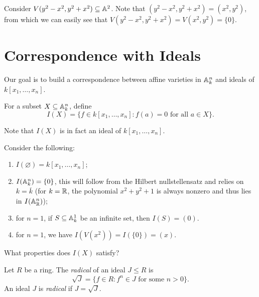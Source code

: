 \begin{example}
  Consider $V(y^2 - x^2, y^2 + x^2) \subseteq \mathbb{A}^2$.
  Note that $(y^2 - x^2, y^2 + x^2) = (x^2, y^2)$,
  from which we can easily see that
  $V(y^2 - x^2, y^2 + x^2) = V(x^2, y^2) = \{0\}$.
\end{example}

\section{Correspondence with Ideals}

\begin{remark}
  Our goal is to build a correspondence
  between affine varieties in $\mathbb{A}^n_k$
  and ideals of $k[x_1, \dots, x_n]$.
\end{remark}

\begin{definition}
  For a subset $X \subseteq \mathbb{A}^n_k$,
  define
  \[
    I(X) = \{f \in k[x_1, \dots, x_n] : f(a) = 0
      \text{ for all } a \in X\}.
  \]
\end{definition}

\begin{remark}
  Note that $I(X)$ is in fact an ideal of
  $k[x_1, \dots, x_n]$.
\end{remark}

\begin{example}
  Consider the following:
  \begin{enumerate}
    \item $I(\varnothing) = k[x_1, \dots, x_n]$;
    \item $I(\mathbb{A}^n_k) = \{0\}$, this
      will follow from the
      Hilbert nullstellensatz and
      relies on $k = \overline{k}$ (for
      $k = \mathbb{R}$, the polynomial $x^2 + y^2 + 1$ is
      always nonzero and thus lies in
      $I(\mathbb{A}^n_{\mathbb{R}})$);
    \item for $n = 1$, if
      $S \subseteq \mathbb{A}^1_k$ be an
      infinite set, then $I(S) = (0)$.
    \item for $n = 1$, we have
      $I(V(x^2)) = I(\{0\}) = (x)$.
  \end{enumerate}
\end{example}

\begin{remark}
  What properties does $I(X)$ satisfy?
\end{remark}

\begin{definition}
  Let $R$ be a ring.
  The \emph{radical} of an ideal
  $J \le R$ is
  \[
    \sqrt{J} = \{
      f \in R : f^n \in J \text{ for some }
      n > 0
    \}.
  \]
  An ideal $J$ is \emph{radical} if
  $J = \sqrt{J}$.
\end{definition}

